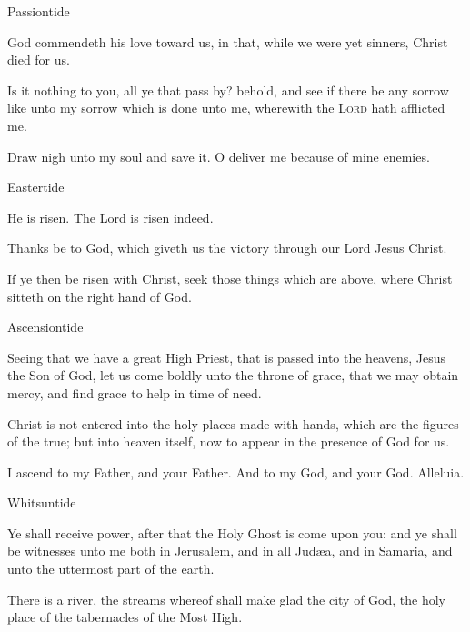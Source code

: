 \begin{multicols}{2}
\begin{inhead}
Passiontide
\end{inhead}\noindent
    God commendeth his love toward us, in that, while we were yet sinners, Christ died for us.\par
    Is it nothing to you, all ye that pass by? behold, and see if there be any sorrow like unto my sorrow which is done unto me, wherewith the \textsc{Lord} hath afflicted me.\par
Draw nigh unto my soul and save it. O deliver me because of mine enemies.

\begin{inhead}
Eastertide
\end{inhead}\noindent
    He is risen. The Lord is risen indeed.\par
    Thanks be to God, which giveth us the victory through our Lord Jesus Christ.\par
    If ye then be risen with Christ, seek those things which are above, where Christ sitteth on the right hand of God.

\begin{inhead}
Ascensiontide
\end{inhead}\noindent
    Seeing that we have a great High Priest, that is passed into the heavens, Jesus the Son of God, let us come boldly unto the throne of grace, that we may obtain mercy, and find grace to help in time of need.\par
    
    Christ is not entered into the holy places made with hands, which are the figures of the true; but into heaven itself, now to appear in the presence of God for us.\par

    I ascend to my Father, and your Father. And to my God, and your God. Alleluia.

\begin{inhead}
Whitsuntide
\end{inhead}\noindent
    Ye shall receive power, after that the Holy Ghost is come upon you: and ye shall be witnesses unto me both in Jerusalem, and in all Jud{\ae}a, and in Samaria, and unto the uttermost part of the earth.\par
    
    There is a river, the streams whereof shall make glad the city of God, the holy place of the tabernacles of the Most High.\par


\end{multicols}
